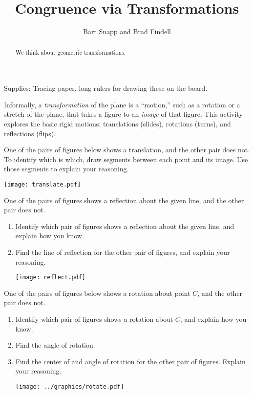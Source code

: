 \documentclass[nooutcomes]{ximera}
\title{Congruence via Transformations}
\author{Bart Snapp and Brad Findell}
\begin{document}
\begin{abstract}
  We think about geometric transformations.
\end{abstract}
\maketitle

\begin{teachingnote}
Supplies:  Tracing paper, long rulers for drawing these on the board.  
\end{teachingnote}

Informally, a \emph{transformation} of the plane is a ``motion,'' such
as a rotation or a stretch of the plane, that takes a figure to an
\emph{image} of that figure.  This activity explores the basic rigid
motions: translations (slides), rotations (turns), and reflections
(flips).


\begin{problem}
One of the pairs of figures below shows a translation, and the other
pair does not.  To identify which is which, draw segments between each
point and its image.  Use those segments to explain your reasoning.
\begin{image}
\texttt{[image: translate.pdf]}
\end{image}
\end{problem}

\newpage
\begin{problem}
One of the pairs of figures shows a reflection about the given line, and the other pair does not.  
\begin{enumerate}
\item Identify which pair of figures shows a reflection about the given line, and explain how you know. 
\item Find the line of reflection for the other pair of figures, and explain your reasoning.  
\begin{image}
\texttt{[image: reflect.pdf]}
\end{image}
\end{enumerate}
\end{problem}

\newpage
\begin{problem}
One of the pairs of figures below shows a rotation about point $C$, and the other pair does not. 
\begin{enumerate}
\item Identify which pair of figures shows a rotation about $C$, and explain how you know.  
\item Find the angle of rotation.  
\item Find the center of and angle of rotation for the other pair of figures.  Explain your reasoning.  
\begin{image}
\texttt{[image: ../graphics/rotate.pdf]}
\end{image}
\end{enumerate}
\end{problem}
\end{document}
